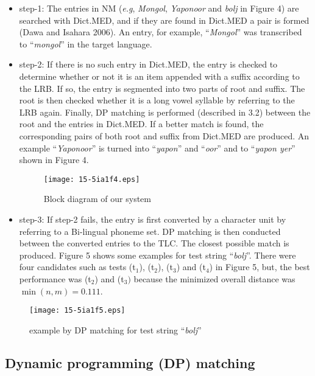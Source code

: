 \documentclass[english]{jnlp_1.4}
\begin{document}
\begin{itemize}
\item
step-1: The entries in NM (\textit{e.g}, \textit{Mongol}, \textit{Yaponoor} and \textit{bolj} in Figure 4) are searched with 
Dict.MED, and if they are found in Dict.MED a pair is formed (Dawa and 
Isahara 2006). An entry, for example, ``\textit{Mongol}'' was transcribed to ``\textit{mongol}'' in the 
target language.

\item
step-2: If there is no such entry in Dict.MED, the entry is checked to 
determine whether or not it is an item appended with a suffix according to 
the LRB. If so, the entry is segmented into two parts of root and suffix. 
The root is then checked whether it is a long vowel syllable by referring to 
the LRB again. Finally, DP matching is performed (described in 3.2) between 
the root and the entries in Dict.MED. If a better match is found, the 
corresponding pairs of both root and suffix from Dict.MED are produced. An 
example ``\textit{Yaponoor}'' is turned into ``\textit{yapon}'' and ``\textit{oor}'' and to ``\textit{yapon yer}'' shown in Figure 4.

\begin{figure}[t]
\centerline{\texttt{[image: 15-5ia1f4.eps]}}
\caption{Block diagram of our system}
\vspace{-1\baselineskip}
\end{figure}

\item
step-3: If step-2 fails, the entry is first converted by a character unit 
by referring to a Bi-lingual phoneme set. DP matching is then conducted 
between the converted entries to the TLC. The closest possible match is 
produced. Figure 5 shows some examples for test string ``\textit{bolj}''. There were four 
candidates such as tests (t$_{1}$), (t$_{2}$), (t$_{3}$) and (t$_{4}$) in 
Figure 5, but, the best performance was (t$_{2}$) and (t$_{3})$ because the 
minimized overall distance was $\min (n,m)=0.111$.
\end{itemize}

\begin{figure}[t]
\centerline{\texttt{[image: 15-5ia1f5.eps]}}
\caption{example by DP matching for test string ``\textit{bolj}''}
\end{figure}



\subsection{Dynamic programming (DP) matching}
\end{document}
